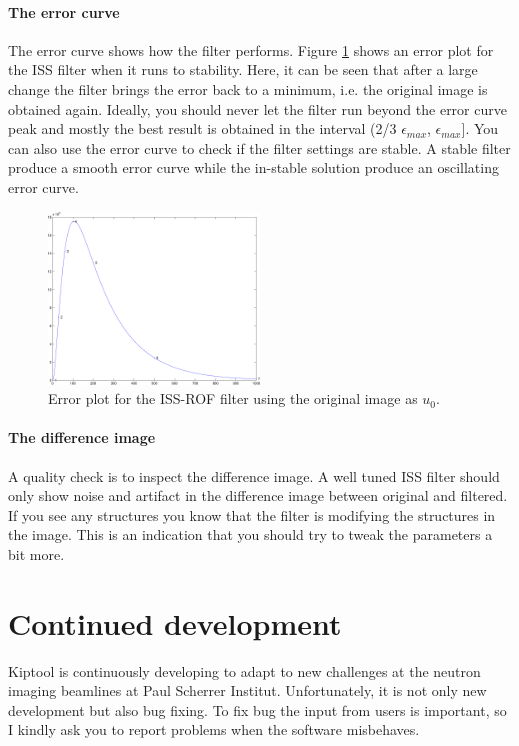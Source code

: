 \documentclass[a4paper]{scrreprt}
\begin{document}
\subsubsection{The error curve}
The error curve shows how the filter performs. Figure \ref{fig_iss_errorplot} shows an error plot for the ISS filter when it runs to stability. Here, it can be seen that after a large change the filter brings the error back to a minimum, i.e. the original image is obtained again. Ideally, you should never let the filter run beyond the error curve peak and mostly the best result is obtained in the interval (2/3 $\epsilon_{max}$, $\epsilon_{max}$]. You can also use the error curve to check if the filter settings are stable. A stable filter produce a smooth error curve while the in-stable solution produce an oscillating error curve.
\begin{figure}[ht!]
\centering
\includegraphics[width=0.5\textwidth]{figures/iss_module/errorplot.pdf}
\caption{Error plot for the ISS-ROF filter using the original image as $u_0$.}\label{fig_iss_errorplot}
\end{figure}

\subsubsection{The difference image}
A quality check is to inspect the difference image. A well tuned ISS filter should only show noise and artifact in the difference image between original and filtered. If you see any structures you know that the filter is modifying the structures in the image. This is an indication that you should try to tweak the parameters a bit more.

\chapter{Continued development}
Kiptool is continuously developing to adapt to new challenges at the neutron
imaging beamlines at Paul Scherrer Institut. Unfortunately, it is not only new
development but also bug fixing. To fix bug the input from users is important,
so I kindly ask you to report problems when the software misbehaves.
\end{document}
